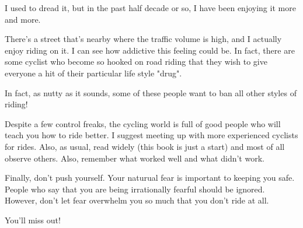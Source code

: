 I used to dread it, but in the past half decade or so, I have been enjoying it more and more.

There's a street that's nearby where the traffic volume is high, and I actually
enjoy riding on it. I can see how addictive this feeling could be. In fact,
there are some cyclist who become so hooked on road riding that they wish to
give everyone a hit of their particular life style "drug".

In fact, as nutty as it sounds, some of these people want to ban all other styles of riding!

Despite a few control freaks, the cycling world is full of good people who will
teach you how to ride better. I suggest meeting up with more experienced
cyclists for rides. Also, as usual, read widely (this book is just a start) and
most of all observe others. Also, remember what worked well and what didn't
work.

Finally, don't push yourself. Your naturual fear is important to keeping you
safe. People who say that you are being irrationally fearful should be ignored.
However, don't let fear overwhelm you so much that you don't ride at all. 

You'll miss out!

